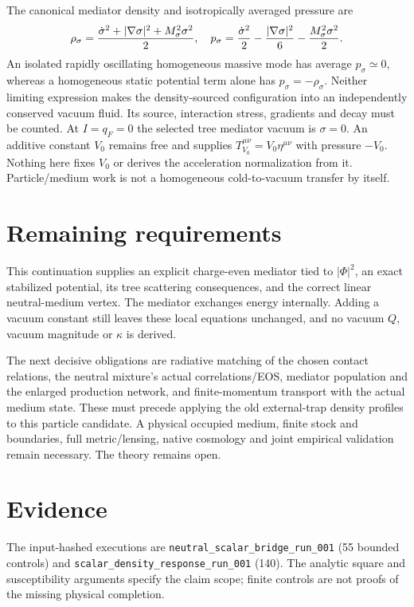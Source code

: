 \documentclass[11pt]{article}
\begin{document}
The canonical mediator density and isotropically averaged pressure are
\begin{equation}
 \rho_\sigma={\dot\sigma^2+|\nabla\sigma|^2+M_\sigma^2\sigma^2\over2},
 \quad p_\sigma={\dot\sigma^2\over2}
                -{|\nabla\sigma|^2\over6}
                -{M_\sigma^2\sigma^2\over2}.
\end{equation}
An isolated rapidly oscillating homogeneous massive mode has average
$p_\sigma\simeq0$, whereas a homogeneous static potential term alone has
$p_\sigma=-\rho_\sigma$. Neither limiting expression makes the
density-sourced configuration into an independently conserved vacuum fluid.
Its source, interaction stress, gradients and decay must be counted.
At $I=q_F=0$ the selected tree mediator vacuum is $\sigma=0$.
An additive constant $V_0$ remains free and supplies
$T_{V_0}^{\mu\nu}=V_0\eta^{\mu\nu}$ with pressure $-V_0$.
Nothing here fixes $V_0$ or derives the acceleration normalization from it.
Particle/medium work is not a homogeneous cold-to-vacuum transfer by itself.

\section{Remaining requirements}
This continuation supplies an explicit charge-even mediator tied to
$|\Phi|^2$, an exact stabilized potential, its tree scattering consequences,
and the correct linear neutral-medium vertex. The mediator exchanges energy
internally. Adding a vacuum constant still leaves these local equations
unchanged, and no vacuum $Q$, vacuum magnitude or $\kappa$ is derived.

The next decisive obligations are radiative matching of the chosen contact
relations, the neutral mixture's actual correlations/EOS, mediator population
and the enlarged production network, and finite-momentum transport with the
actual medium state. These must precede applying the old external-trap
density profiles to this particle candidate. A physical occupied medium,
finite stock and boundaries, full metric/lensing, native cosmology and joint
empirical validation remain necessary. The theory remains open.

\section{Evidence}
The input-hashed executions are
\texttt{neutral\_scalar\_bridge\_run\_001} (55 bounded controls) and
\texttt{scalar\_density\_response\_run\_001} (140).
The analytic square and susceptibility arguments specify the claim scope;
finite controls are not proofs of the missing physical completion.
\end{document}
